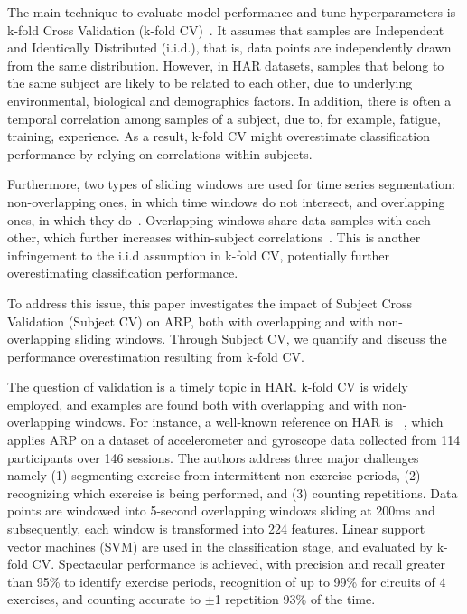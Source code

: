 \documentclass[sigconf]{acmart}
\begin{document}
The main technique to evaluate 
model performance and tune hyperparameters is k-fold Cross Validation (k-fold CV)~\cite{arlot2010survey}. It 
assumes that samples are Independent and Identically Distributed 
(i.i.d.), that is, data points are independently drawn from the same 
distribution. However, in HAR datasets, samples that belong to the same subject are likely to be related to each other, due to underlying environmental, biological and demographics factors. In addition, there is often a temporal correlation among samples 
of a subject, due to, for example, fatigue, training, experience. As a result, k-fold CV might overestimate classification performance by relying on correlations within 
subjects.

Furthermore, two types of sliding windows are used for time series segmentation: non-overlapping ones, in which time windows do not intersect, 
and overlapping ones, in which they do~\cite{lara2013survey}. Overlapping 
windows share data samples with each other, which further increases 
within-subject correlations~\cite{coggeshall2005asset}. This is another infringement to the i.i.d assumption in k-fold CV, potentially further overestimating
classification performance.    

To address this issue, this paper investigates the impact of  
Subject Cross Validation (Subject CV) on ARP, both with overlapping and 
with non-overlapping sliding windows. Through Subject CV, we quantify and discuss the performance overestimation resulting from k-fold CV. 

The question of validation is a timely topic in HAR. k-fold CV is 
widely employed, and examples are found both with overlapping and with 
non-overlapping windows. 
For instance, a well-known reference on HAR is 
~\cite{morris2014recofit}, which applies ARP on a dataset of 
accelerometer and gyroscope data collected from 114 participants over 
146 sessions. The authors address three major challenges namely (1) 
segmenting exercise from intermittent non-exercise periods, (2) 
recognizing which exercise is being performed, and (3) counting 
repetitions. Data points 
are windowed into 5-second overlapping windows sliding at 200ms and subsequently, 
each window is transformed into 224 features. Linear support vector 
machines (SVM) are used in the classification stage, and evaluated by 
k-fold CV. Spectacular performance is achieved, with precision and 
recall greater than 95\% to identify exercise periods, recognition 
of up to 99\% for circuits of 4 exercises, and counting  
accurate to $\pm$1 repetition 93\% of the time.
\end{document}
